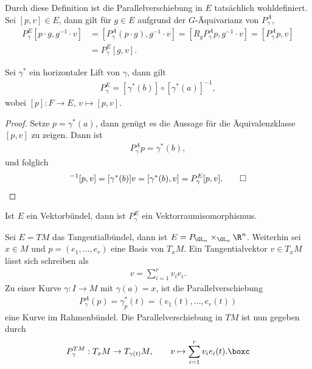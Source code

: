 \documentclass[%
	paper=a5,%
	fleqn,%
	DIV=18,%
	BCOR=0mm,
	fontsize=11pt,
	titlepage=false,%
	bibliography=totoc,
	DIV=18,%
	twoside=true,
	pdftitle=Riemannsche Geometrie,
	pdfauthor=Uwe Semmelmann,
	numbers=noendperiod]%
	{scrbook}
\begin{document}
\begin{rem}[Bemerkungen.]
\begin{remenum}
\item
Durch diese Definition ist die Parallelverschiebung in $E$
tatsächlich wohldefiniert. Sei $[p,v]\in E$, dann gilt für $g\in E$ aufgrund der
$G$-Äquivarianz von $P_\gamma^A$,
\begin{align*}
P_\gamma^E [p\cdot g,g^{-1}\cdot v]
&= \left[P_\gamma^A (p\cdot g),g^{-1}\cdot v \right]
= \left[R_g P_\gamma^A p,g^{-1}\cdot v \right]
= \left[P_\gamma^A p,v \right]\\
&= P_\gamma^E [g,v].
\end{align*}
\item Sei $\gamma^*$ ein horizontaler Lift von $\gamma$, dann gilt
\begin{align*}
P_\gamma^E = [\gamma^*(b)]\circ [\gamma^*(a)]^{-1},
\end{align*}
wobei $[p]:F\to E$, $v\mapsto [p,v]$.
\begin{proof}
Setze $p = \gamma^*(a)$, dann genügt es die Aussage für die Äquivalenzklasse
$[p,v]$ zu zeigen. Dann ist
\begin{align*}
P_\gamma^A p = \gamma^*(b),
\end{align*}
und folglich
\begin{align*}
[\gamma^*(b)][\gamma^*(a)]^{-1}[p,v]
= [\gamma^*(b)]v = 
[\gamma^*(b),v] = P_\gamma^E [p,v].\qed 
\end{align*}
\end{proof}
\item Ist $E$ ein Vektorbündel, dann ist $P_\gamma^E$ ein
Vektorraumisomorphismus.\map
\end{remenum}
\end{rem}

\begin{ex}
Sei $E= TM$ das Tangentialbündel, dann ist $E= P_{\GL_n}\times_{\GL_n} \R^n$.
Weiterhin sei $x\in M$ und $p = (e_1,\ldots,e_r)$ eine Basis von $T_xM$. Ein
Tangentialvektor $v\in T_xM$ lässt sich schreiben als
\begin{align*}
v = \sum_{i=1}^r v_i e_i.
\end{align*} 
Zu einer Kurve $\gamma: I\to M$ mit $\gamma(a) = x$, ist die
Parallelverschiebung
\begin{align*}
P_\gamma^A (p) = \gamma_p^*(t) = (e_1(t),\ldots,e_r(t))
\end{align*}
eine Kurve im Rahmenbündel. Die Parallelverschiebung in $TM$ ist nun gegeben
durch
\begin{align*}
P^{TM}_\gamma : T_xM\to T_{\gamma(t)}M,\qquad v\mapsto \sum_{i=1}^r v_i e_i(t).\boxc
\end{align*}
\end{ex}
\end{document}

